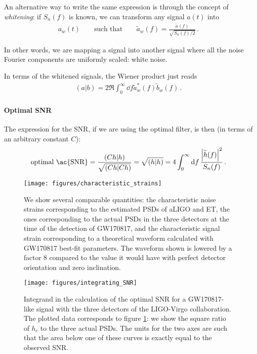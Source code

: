 \documentclass[main.tex]{subfiles}
\begin{document}
An alternative way to write the same expression is through the concept of \emph{whitening}: if \(S_n(f)\) is known, we can transform any signal \(a(t)\) into 
%
\begin{align}
a_w(t) \qquad \text{such that} \qquad \widetilde{a}_w (f) = \frac{\widetilde{a}(f)}{\sqrt{S_n(f) / 2}}
\,.
\end{align}

In other words, we are mapping a signal into another signal where all the noise Fourier components are uniformly scaled: white noise. 

In terms of the whitened signals, the Wiener product just reads 
%
\begin{align}
(a|b) = 2 \Re \int_{0}^{\infty } \dd{f} \widetilde{a}_w^{*} (f) \widetilde{b}_w(f) 
\,.
\end{align}

\paragraph{Optimal \ac{SNR}}

The expression for the \ac{SNR}, if we are using the optimal filter, is then (in terms of an arbitrary constant \(C\)):
%
\begin{align}
\text{optimal \ac{SNR}} = \frac{(Ch | h)}{\sqrt{(Ch|Ch)}} = \sqrt{(h|h)} 
= 4 \int_{0}^{\infty } \dd{f} \frac{\abs{\widetilde{h}(f)}^2}{S_n(f)}
\,.
\end{align}

\begin{figure}[ht]
\centering
\texttt{[image: figures/characteristic\_strains]}
\caption{We show several comparable quantities: the characteristic noise strains corresponding to the estimated 
\acp{PSD} of \ac{aLIGO} and \ac{ET}, the ones corresponding to the actual \acp{PSD} in the three detectors at the time of the detection of GW170817, and the characteristic signal strain corresponding to a theoretical waveform calculated with GW170817 best-fit parameters. 
The waveform shown is lowered by a factor \(8\) compared to the value it would have with perfect detector orientation and zero inclination. 
}
\label{fig:characteristic_strains}
\end{figure}

\begin{figure}[ht]
\centering
\texttt{[image: figures/integrating\_SNR]}
\caption{Integrand in the calculation of the optimal \ac{SNR} for a GW170817-like signal with the three detectors of the \ac{LIGO}-Virgo collaboration. The plotted data corresponds to figure \ref{fig:characteristic_strains}: we show the square ratio of \(h_c\) to the three actual \acp{PSD}. The units for the two axes are such that the area below one of these curves is exactly equal to the observed \ac{SNR}.}
\label{fig:integrating_SNR}
\end{figure}
\end{document}
